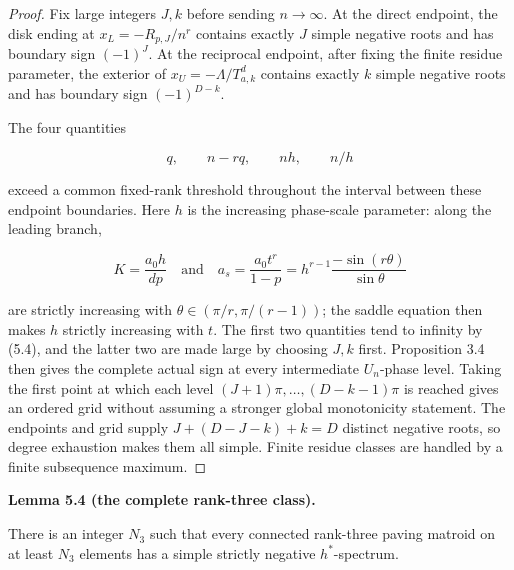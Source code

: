 \documentclass[10pt]{article}
\newenvironment{mdstatement}[1]
  {\par\Needspace{0.16\textheight}\noindent\textbf{#1.}\ \itshape}
  {\par\normalfont}
\begin{document}
\begin{proof}


Fix large integers $J,k$ before sending $n\to\infty$.  At the direct
endpoint, the disk ending at $x_L=-R_{p,J}/n^r$ contains exactly $J$
simple negative roots and has boundary sign $(-1)^J$.  At the reciprocal
endpoint, after fixing the finite residue parameter, the exterior of
$x_U=-\Lambda/T_{a,k}^d$ contains exactly $k$ simple negative roots and
has boundary sign $(-1)^{D-k}$.

The four quantities

\[
 q,\qquad n-rq,\qquad nh,\qquad n/h \tag{5.5}
\]

exceed a common fixed-rank threshold throughout the interval between these
endpoint boundaries.  Here $h$ is the increasing phase-scale parameter:
along the leading branch,

\[
 K=\frac{a_0h}{dp}
 \quad\text{and}\quad
 a_s=\frac{a_0t^r}{1-p}
   =h^{r-1}\frac{-\sin(r\theta)}{\sin\theta}
\]

are strictly increasing with $\theta\in(\pi/r,\pi/(r-1))$; the saddle
equation then makes $h$ strictly increasing with $t$.
The first two quantities tend to infinity by (5.4), and the latter two are
made large by choosing $J,k$ first.  Proposition 3.4 then gives the complete
actual sign at every intermediate $U_n$-phase level.  Taking the first
point at which each level $(J+1)\pi,\ldots,(D-k-1)\pi$ is reached gives an
ordered grid without assuming a stronger global monotonicity statement.
The endpoints and grid supply $J+(D-J-k)+k=D$ distinct negative roots, so
degree exhaustion makes them all simple.  Finite residue classes are handled
by a finite subsequence maximum.
\end{proof}


\begin{mdstatement}{Lemma 5.4 (the complete rank-three class)}


There is an integer $N_3$ such that every connected rank-three paving
matroid on at least $N_3$ elements has a simple strictly negative
$h^*$-spectrum.

\end{mdstatement}
\end{document}
